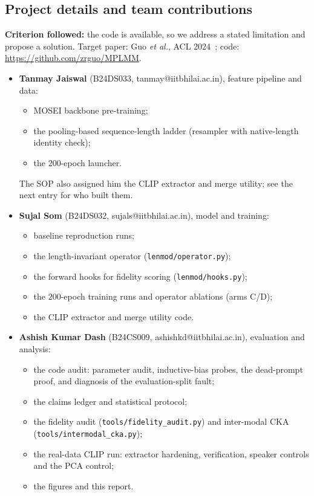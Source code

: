 \documentclass[lettersize,journal]{IEEEtran}
\begin{document}
\subsection{Project details and team contributions}
\textbf{Criterion followed:} the code is available, so we address a stated limitation and propose a solution. Target paper: Guo \emph{et al.}, ACL 2024~\cite{guo2024mplmm}; code: \url{https://github.com/zrguo/MPLMM}.
\begin{itemize}
\item \textbf{Tanmay Jaiswal} (B24DS033, tanmay@iitbhilai.ac.in), feature pipeline and data:
  \begin{itemize}
  \item MOSEI backbone pre-training;
  \item the pooling-based sequence-length ladder (resampler with native-length identity check);
  \item the 200-epoch launcher.
  \end{itemize}
  The SOP also assigned him the CLIP extractor and merge utility; see the next entry for who built them.
\item \textbf{Sujal Som} (B24DS032, sujals@iitbhilai.ac.in), model and training:
  \begin{itemize}
  \item baseline reproduction runs;
  \item the length-invariant operator (\texttt{lenmod/operator.py});
  \item the forward hooks for fidelity scoring (\texttt{lenmod/hooks.py});
  \item the 200-epoch training runs and operator ablations (arms C/D);
  \item the CLIP extractor and merge utility code.
  \end{itemize}
\item \textbf{Ashish Kumar Dash} (B24CS009, ashishkd@iitbhilai.ac.in), evaluation and analysis:
  \begin{itemize}
  \item the code audit: parameter audit, inductive-bias probes, the dead-prompt proof, and diagnosis of the evaluation-split fault;
  \item the claims ledger and statistical protocol;
  \item the fidelity audit (\texttt{tools/fidelity\_audit.py}) and inter-modal CKA (\texttt{tools/intermodal\_cka.py});
  \item the real-data CLIP run: extractor hardening, verification, speaker controls and the PCA control;
  \item the figures and this report.
  \end{itemize}
\end{itemize}
\end{document}
